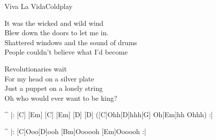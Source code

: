 \begin{song}{Viva La Vida}{Coldplay}

\begin{guitar}
It was the wicked and wild wind \\
Blew down the doors to let me in. \\
Shattered windows and the sound of drums \\
People couldn't believe what I'd become\\
\end{guitar}

\begin{guitar}
Revolutionaries wait \\
For my head on a silver plate \\
Just a puppet on a lonely string\\
Oh who would ever want to be king? \\
\end{guitar}



\begin{guitar}
^ |: [C] [Em] [C] [Em] [D] [D]  ([C]Ohh[D]hhh[G] Oh[Em]hh Ohhh) :|\\
\end{guitar}


\begin{guitar}
^ |: [C]Ooo[D]ooh [Bm]Oooooh [Em]Oooooh :|\\
\end{guitar}
\end{song}
